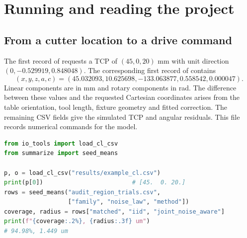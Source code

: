 \clearpage\section{Running and reading the project}
\subsection{From a cutter location to a drive command}
The first record of  requests a TCP of $(45,0,20)$ mm with unit direction $(0,-0.529919,0.848048)$. The corresponding first record of  contains
\[
 (x,y,z,a,c)=(45.032093,10.625698,-133.063877,0.558542,0.000047).
\]
Linear components are in mm and rotary components in rad. The difference between these values and the requested Cartesian coordinates arises from the table orientation, tool length, fixture geometry and fitted correction. The remaining CSV fields give the simulated TCP and angular residuals. This file records numerical commands for the model.

\begin{lstlisting}[language=Python]
from io_tools import load_cl_csv
from summarize import seed_means

p, o = load_cl_csv("results/example_cl.csv")
print(p[0])                         # [45.  0. 20.]
rows = seed_means("audit_region_trials.csv",
                  ["family", "noise_law", "method"])
coverage, radius = rows["matched", "iid", "joint_noise_aware"]
print(f"{coverage:.2%}, {radius:.3f} um")
# 94.98%, 1.449 um
\end{lstlisting}

